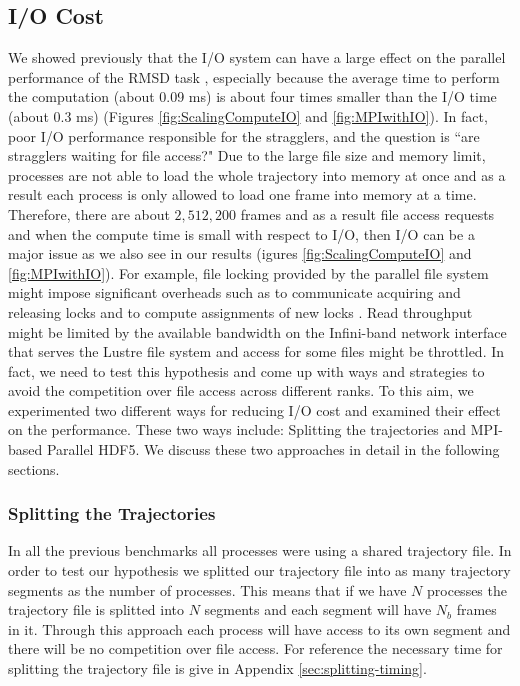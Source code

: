 \subsection{I/O Cost}
\label{I/O}
We showed previously that the I/O system can have a large effect on the parallel performance of the RMSD task \citep{Khoshlessan:2017ab},
especially because the average time to perform the computation \tcomp (about 0.09 ms) is about four times smaller than the I/O time \tIO (about 0.3 ms) (Figures \ref{fig:ScalingComputeIO} and \ref{fig:MPIwithIO}). 
In fact, poor I/O performance responsible for the stragglers, and the question is ``are stragglers waiting for file access?" 
Due to the large file size and memory limit, processes are not able to load the whole trajectory into memory at once and as a result each process is only allowed to load one frame into memory at a time.
Therefore, there are about $2,512,200$ frames and as a result file access requests and when the compute time is small with respect to I/O, then I/O can be a major issue as we also see in our results (igures \ref{fig:ScalingComputeIO} and \ref{fig:MPIwithIO}).   
For example, file locking provided by the parallel file system might impose significant overheads such as
to communicate acquiring and releasing locks and to compute assignments of new locks \citep{Sehrish:2009aa}.  
Read throughput might be limited by the available bandwidth on the Infini-band network interface that serves the Lustre file system and access for some files might be throttled.
In fact, we need to test this hypothesis and come up with ways and strategies to avoid the competition over file access across different ranks.
To this aim, we experimented two different ways for reducing I/O cost and examined their effect on the performance.
These two ways include: Splitting the trajectories and MPI-based Parallel HDF5.
We discuss these two approaches in detail in the following sections.

\subsubsection{Splitting the Trajectories}
\label{Splitting}
In all the previous benchmarks all processes were using a shared trajectory file.
In order to test our hypothesis we splitted our trajectory file into as many trajectory segments as the number of processes.
This means that if we have $N$ processes the trajectory file is splitted into $N$ segments and each segment will have $N_{b}$ frames in it. 
Through this approach each process will have access to its own segment and there will be no competition over file access. 
For reference the necessary time for splitting the trajectory file is give in Appendix \ref{sec:splitting-timing}.

